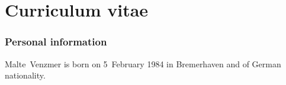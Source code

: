 
\chapter*{Curriculum vitae}

% 
% 
% 


\vspace{2\baselineskip}

\subsection*{Personal information}
Malte~Venzmer is born on 5~February 1984 in Bremerhaven and of German nationality.

